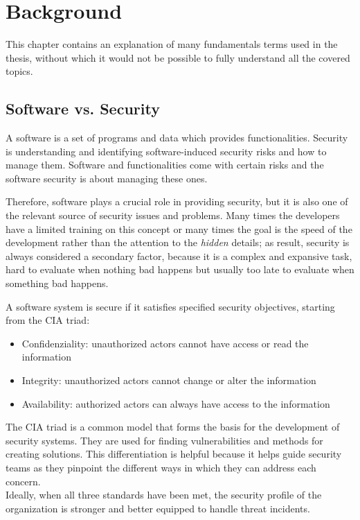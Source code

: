 \chapter{Background}
\label{cha:background}


This chapter contains an explanation of many fundamentals terms used in the thesis, without which it would not be possible to fully understand all the covered topics. 

\section{Software vs. Security}

A software is a set of programs and data which provides functionalities. Security is understanding and identifying software-induced security risks and how to manage them. Software and functionalities come with certain risks and the software security is about managing these ones.

Therefore, software plays a crucial role in providing security, but it is also one of the relevant source of security issues and problems. Many times the developers have a limited training on this concept or many times the goal is the speed of the development rather than the attention to the \textit{hidden} details; as result, security is always considered a secondary factor, because it is a complex and expansive task, hard to evaluate when nothing bad happens but usually too late to evaluate when something bad happens.~\cite{st-slides}

A software system is secure if it satisfies specified security objectives, starting from the CIA triad:
\begin{itemize}
  \item Confidenziality: unauthorized actors cannot have access or read the information
  \item Integrity: unauthorized actors cannot change or alter the information
  \item Availability: authorized actors can always have access to the information
\end{itemize}
The CIA triad is a common model that forms the basis for the development of security systems. They are used for finding vulnerabilities and methods for creating solutions. This differentiation is helpful because it helps guide security teams as they pinpoint the different ways in which they can address each concern.\\
Ideally, when all three standards have been met, the security profile of the organization is stronger and better equipped to handle threat incidents.~\cite{cia-triad}

